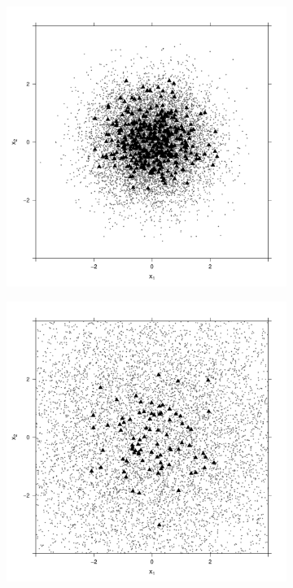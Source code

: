 \begin{figure}[htbp]
    \centering
    \begin{subfigure}{0.45\textwidth}
        \includegraphics[width=\textwidth]{results/p1.0_100_1.0_1h/output/population_and_incidents_scatter}
        \label{fig:one_sample:pop_spread:1.0}
    \end{subfigure}
    \begin{subfigure}{0.45\textwidth}
        \includegraphics[width=\textwidth]{results/p2.8_100_1.0_1h/output/population_and_incidents_scatter}

\end{subfigure}
\end{figure}
